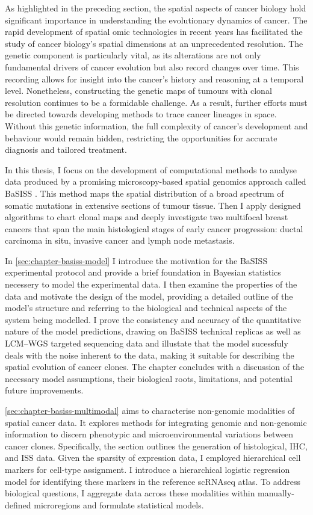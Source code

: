 As highlighted in the preceding section, the spatial aspects of cancer biology hold significant importance in understanding the evolutionary dynamics of cancer. The rapid development of spatial omic technologies in recent years has facilitated the study of cancer biology's spatial dimensions at an unprecedented resolution. The genetic component is particularly vital, as its alterations are not only fundamental drivers of cancer evolution but also record changes over time. This recording allows for insight into the cancer's history and reasoning at a temporal level. Nonetheless, constructing the genetic maps of tumours with clonal resolution continues to be a formidable challenge. As a result, further efforts must be directed towards developing methods to trace cancer lineages in space. Without this genetic information, the full complexity of cancer's development and behaviour would remain hidden, restricting the opportunities for accurate diagnosis and tailored treatment.

In this thesis, I focus on the development of computational methods to analyse data produced by a promising microscopy-based spatial genomics approach called \acf{BaSISS} \parencite{Lomakin2022-ks}. This method maps the spatial distribution of a broad spectrum of somatic mutations in extensive sections of tumour tissue. Then I apply designed algorithms to chart clonal maps and deeply investigate two multifocal breast cancers that span the main histological stages of early cancer progression: ductal carcinoma in situ, invasive cancer and lymph node metastasis. 

In \cref{sec:chapter-basiss-model} I introduce the motivation for the \ac{BaSISS} experimental protocol and provide a brief foundation in Bayesian statistics necessery to model the experimental data. I then examine the properties of the data and motivate the design of the model, providing a detailed outline of the model's structure and referring to the biological and technical aspects of the system being modelled. I prove the consistency and accuracy of the quantitative nature of the model predictions, drawing on \ac{BaSISS} technical replicas as well as \acs{LCM}–\acs{WGS} targeted sequencing data and illustate that the model sucessfuly deals with the noise inherent to the data, making it suitable for describing the spatial evolution of cancer clones. The chapter concludes with a discussion of the necessary model assumptions, their biological roots, limitations, and potential future improvements.

\cref{sec:chapter-basiss-multimodal} aims to characterise non-genomic modalities of spatial cancer data. It explores methods for integrating genomic and non-genomic information to discern phenotypic and microenvironmental variations between cancer clones. Specifically, the section outlines the generation of histological, \acf{IHC}, and \acf{ISS} data. Given the sparsity of expression data, I employed hierarchical cell markers for cell-type assignment. I introduce a hierarchical logistic regression model for identifying these markers in the reference \ac{scRNAseq} atlas. To address biological questions, I aggregate data across these modalities within manually-defined microregions and formulate statistical models.  


